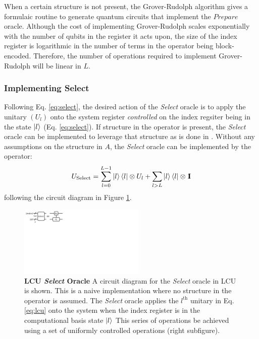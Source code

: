 When a certain structure is not present, the Grover-Rudolph algorithm \cite{grover2002creating} gives a formulaic routine to generate quantum circuits that implement the $\textit{Prepare}$ oracle.
Although the cost of implementing Grover-Rudolph scales exponentially with the number of qubits in the register it acts upon, the size of the index register is logarithmic in the number of terms in the operator being block-encoded.
Therefore, the number of operations required to implement Grover-Rudolph will be linear in $L$.

\subsubsection{Implementing \textbf{Select}}

Following Eq. \ref{eq:select}, the desired action of the \textit{Select} oracle is to apply the unitary $(U_l)$ onto the system register \textit{controlled} on the index regsiter being in the state $\ket{l}$ (Eq. \ref{eq:select}).
If structure in the operator is present, the \textit{Select} oracle can be implemented to leverage that structure as is done in \cite{babbush2018encoding}.
Without any assumptions on the structure in $A$, the \textit{Select} oracle can be implemented by the operator:
\begin{equation}
    \label{eq:select-naive}
    U_\text{Select} = \sum_{l=0}^{L-1} \ket{l}\bra{l} \otimes U_l + \sum_{l>L} \ket{l}\bra{l} \otimes {\rm 1\!\!I}
\end{equation}
following the circuit diagram in Figure \ref{fig:unstructured-select}.

\begin{figure}[h]
    \includegraphics[width=6cm]{figures/select-lcu.pdf}
    \caption{
        \textbf{LCU \textit{Select} Oracle}
        A circuit diagram for the \textit{Select} oracle in LCU is shown.
        This is a naive implementation where no structure in the operator is assumed.
        The \textit{Select} oracle applies the $l^\text{th}$ unitary in Eq. \ref{eq:lcu} onto the system when the index register is in the computational basis state $\ket{l}$
        This series of operations be achieved using a set of uniformly controlled operations (right subfigure).
    }
    \label{fig:unstructured-select}
\end{figure}

